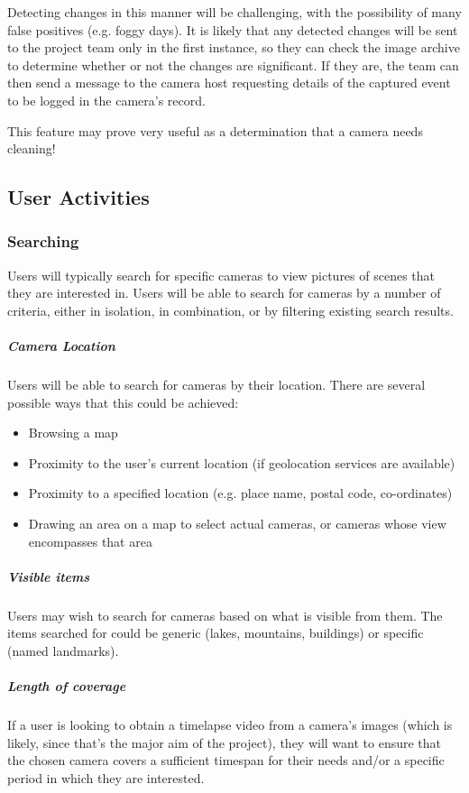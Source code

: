 \documentclass[11pt]{article}
\begin{document}
Detecting changes in this manner will be challenging, with the possibility of many false positives (e.g. foggy days). It is likely that any detected changes will be sent to the project team only in the first instance, so they can check the image archive to determine whether or not the changes are significant. If they are, the team can then send a message to the camera host requesting details of the captured event to be logged in the camera's record.

This feature may prove very useful as a determination that a camera needs cleaning!

\subsection{User Activities}
\subsubsection{Searching}
Users will typically search for specific cameras to view pictures of scenes that they are interested in. Users will be able to search for cameras by a number of criteria, either in isolation, in combination, or by filtering existing search results.

\subparagraph{Camera Location}
Users will be able to search for cameras by their location. There are several possible ways that this could be achieved:

\begin{itemize}
\item Browsing a map
\item Proximity to the user's current location (if geolocation services are available)
\item Proximity to a specified location (e.g. place name, postal code, co-ordinates)
\item Drawing an area on a map to select actual cameras, or cameras whose view encompasses that area
\end{itemize}

\subparagraph{Visible items}
Users may wish to search for cameras based on what is visible from them. The items searched for could be generic (lakes, mountains, buildings) or specific (named landmarks).

\subparagraph{Length of coverage}
If a user is looking to obtain a timelapse video from a camera's images (which is likely, since that's the major aim of the project), they will want to ensure that the chosen camera covers a sufficient timespan for their needs and/or a specific period in which they are interested.
\end{document}
